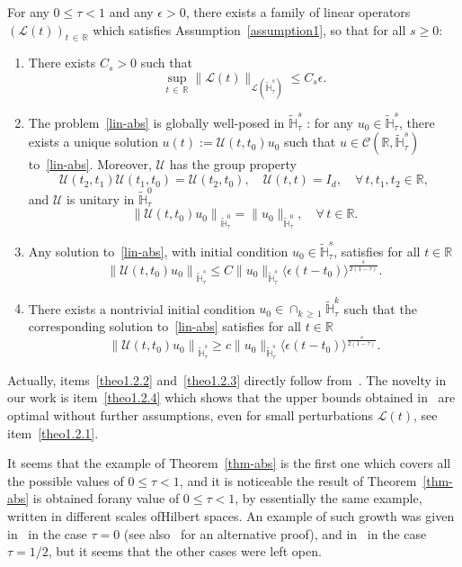 \documentclass[AHL,Unicode,published]{cedram}
\newcommand{\R}{\mathbb{R}}
\newcommand{\HH}{\mathbb{H}}
\newcommand{\clL}{\mathcal{L}}
\newcommand{\clC}{\mathcal{C}}
\newcommand{\clU}{\mathcal{U}}
\renewcommand{\L}{\mathscr{L}}
\newcommand*\eps{\epsilon}
\newcommand*\dis{\displaystyle}
\newcommand{\<}{\langle}
\renewcommand{\>}{\rangle}
\newcommand*{\romanenumi}{\renewcommand*{\theenumi}{\roman{enumi}}}
\let\oldforall\forall
\renewcommand*{\forall}{\mathrel{\oldforall}}
\newcommand{\R}{\mathbb{R}}
\begin{document}
\begin{theo} \label{thm-abs}
For any $0 \leq \tau<1$ and any $\eps>0$, there exists a family of linear operators $(\L(t))_{t\,\in\,\R}$ which satisfies Assumption~\ref{assumption1}, so that for all $s\geq 0$:
\begin{enumerate}\romanenumi
\item\label{theo1.2.1} There exists $C_s>0$ such that
\[
\dis \sup_{t\,\in\,\R}\| \L(t) \|_{ \clL(\widetilde{\HH}_\tau^{s})} \leq C_s \eps.
\]

\item\label{theo1.2.2} The problem~\eqref{lin-abs} is globally well-posed in $\widetilde{\HH}_\tau^{s}$ : for any $u_0\in \widetilde{\HH}_\tau^{s}$, there exists a unique solution $u(t):=\clU(t,t_0)u_0$ such that $u\in \clC(\R, \widetilde{\HH}_\tau^{s})$ to~\eqref{lin-abs}. Moreover, $\clU$ has the group property
\[
\clU(t_2,t_1)\clU(t_1,t_0)=\clU(t_2,t_0), \quad \clU(t,t)=I_d, \quad \forall \, t,t_1, t_2 \in \R,
\]
and $\clU$ is unitary in $\widetilde{\HH}_\tau^{0}$
\[
\left\| \clU(t,t_0)u_0\right\|_{\widetilde{\HH}_\tau^{0}}=\| u_0\|_{\widetilde{\HH}_\tau^{0}},\quad \forall \, t \in \R.
\]
\item\label{theo1.2.3} Any solution to~\eqref{lin-abs}, with initial condition $u_0 \in \widetilde{\HH}_\tau^{s}$, satisfies for all $t\in \R$
\[
\left\| \clU(t,t_0)u_0\right\|_{\widetilde{\HH}_\tau^{s}}\leq C \| u_0\|_{\widetilde{\HH}_\tau^{s}}\<\eps(t-t_0)\>^{\frac s{2(1-\tau)}}.
\]

\item\label{theo1.2.4} There exists a nontrivial initial condition $u_0 \in \cap_{k\,\geq\,1}
\widetilde{\HH}_\tau^{k} $ such that the corresponding solution to~\eqref{lin-abs} satisfies for all $t\in \R$
\[
\left\| \clU(t,t_0)u_0\right\|_{\widetilde{\HH}_\tau^{s}} \geq c \| u_0\|_{\widetilde{\HH}_\tau^{s}}\<\eps(t-t_0)\>^{\frac s{2(1-\tau)}}.
\]
\end{enumerate}
\end{theo}

Actually, items~\eqref{theo1.2.2} and~\eqref{theo1.2.3} directly follow from~\cite[Theorem~1.5]{MasRo}. The novelty in our work is item~\eqref{theo1.2.4} which shows that the upper bounds obtained in~\cite[Theorem~1.5]{MasRo} are optimal without further assumptions, even for small perturbations $\L(t)$, see item~\eqref{theo1.2.1}.

It seems that the example of Theorem~\ref{thm-abs} is the first one which covers all the possible values of $0\leq \tau <1$, and it is noticeable the result of Theorem~\ref{thm-abs} is obtained for\linebreak any value of $0\leq \tau<1$, by essentially the same example, written in different scales of\linebreak Hilbert spaces. An example of such growth was given in~\cite{Delort2} in the case $\tau=0$ (see also~\cite{Maspero} for an alternative proof), and in~\cite[Appendix A]{BGMR2} in the case $\tau=1/2$, but it seems that the other cases were left open.
\end{document}
